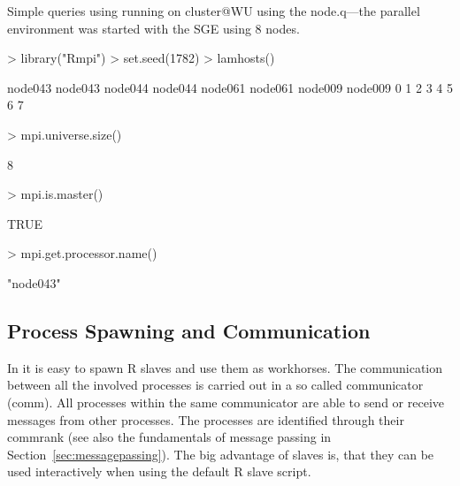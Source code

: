 \begin{Example} Simple queries using \newline
running on cluster@WU using the node.q---the parallel environment was
started with the SGE using 8 nodes.

\begin{Schunk}
\begin{Sinput}
> library("Rmpi")
> set.seed(1782)
> lamhosts()
\end{Sinput}
\begin{Soutput}
node043 node043 node044 node044 node061 node061 node009 node009 
      0       1       2       3       4       5       6       7 
\end{Soutput}
\begin{Sinput}
> mpi.universe.size()
\end{Sinput}
\begin{Soutput}
[1] 8
\end{Soutput}
\begin{Sinput}
> mpi.is.master()
\end{Sinput}
\begin{Soutput}
[1] TRUE
\end{Soutput}
\begin{Sinput}
> mpi.get.processor.name()
\end{Sinput}
\begin{Soutput}
[1] "node043"
\end{Soutput}
\end{Schunk}

\label{ex:Rmpi-init}
\end{Example}

\subsection{Process Spawning and Communication}

In  it is easy to spawn R slaves and use them as
workhorses. The 
communication between all the involved processes is carried out in a
so called communicator (comm). All processes within the same
communicator are able to send or receive messages from other
processes. The processes are identified through their commrank (see
also the fundamentals of message passing in
Section~\ref{sec:messagepassing}). The big advantage of 
slaves is, that they can be used interactively when using the default
R slave script.

